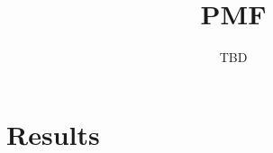 \documentclass[preprint]{emulateapj}
\begin{document}
\title{PMF}
\author{TBD}



\section{Results}
\label{sec:results}



\end{document}
